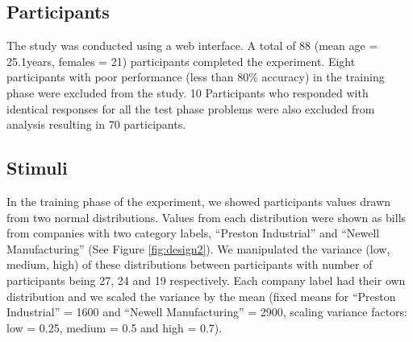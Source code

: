 \documentclass[10pt,letterpaper]{article}
\begin{document}

\subsection{Participants}
The study was conducted using a web interface. A total of 88 (mean age = 25.1years, females = 21) participants completed the experiment. Eight participants with poor performance (less than 80\% accuracy) in the training phase were excluded from the study. 10 Participants who responded with identical responses for all the test phase problems were also excluded from analysis resulting in 70 participants. 

\subsection{Stimuli}
In the training phase of the experiment, we showed participants values drawn from two normal distributions. Values from each distribution were shown as bills from companies with two category labels, “Preston Industrial” and “Newell Manufacturing” (See Figure \ref{fig:design2}). We manipulated the variance (low, medium, high) of these distributions between participants with number of participants being 27, 24 and 19 respectively. Each company label had their own distribution and we scaled the variance by the mean (fixed means for “Preston Industrial” = 1600 and “Newell Manufacturing” = 2900, scaling variance factors: low = 0.25, medium = 0.5 and high = 0.7).  

\end{document}
